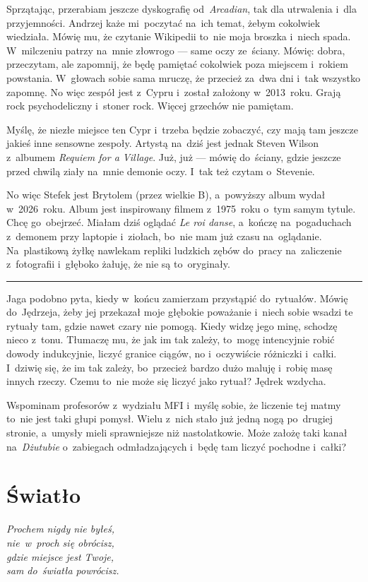 \documentclass[9pt, a5paper]{memoir}
\begin{document}
Sprzątając, przerabiam jeszcze dyskografię od~\textit{Arcadian}, tak dla utrwalenia i~dla przyjemności. Andrzej każe mi~poczytać na~ich temat, żebym cokolwiek wiedziała. Mówię mu, że czytanie Wikipedii to~nie moja broszka i~niech spada. W~milczeniu patrzy na~mnie złowrogo --- same oczy ze~ściany. Mówię: dobra, przeczytam, ale zapomnij, że będę pamiętać cokolwiek poza miejscem i~rokiem powstania. W~głowach sobie sama mruczę, że przecież za~dwa dni i~tak wszystko zapomnę. No więc zespół jest z~Cypru i~został założony w~2013~roku. Grają rock psychodeliczny i~stoner rock. Więcej grzechów nie pamiętam.

Myślę, że niezłe miejsce ten Cypr i~trzeba będzie zobaczyć, czy mają tam jeszcze jakieś inne sensowne zespoły. Artystą na~dziś jest jednak Steven Wilson z~albumem \textit{Requiem for a Village}. Już, już --- mówię do~ściany, gdzie jeszcze przed chwilą ziały na~mnie demonie oczy. I~tak też czytam o~Stevenie.

No więc Stefek jest Brytolem (przez wielkie B), a~powyższy album wydał w~2026~roku. Album jest inspirowany filmem z~1975~roku o~tym samym tytule. Chcę go~obejrzeć. Miałam dziś oglądać \textit{Le roi danse}, a~kończę na~pogaduchach z~demonem przy laptopie i~ziołach, bo~nie mam już czasu na~oglądanie. Na~plastikową żyłkę nawlekam repliki ludzkich zębów do~pracy na~zaliczenie z~fotografii i~głęboko żałuję, że nie są to~oryginały.

\fancybreak{* \quad * \quad *}

Jaga podobno pyta, kiedy w~końcu zamierzam przystąpić do~rytuałów. Mówię do~Jędrzeja, żeby jej przekazał moje głębokie poważanie i~niech sobie wsadzi te rytuały tam, gdzie nawet czary nie pomogą. Kiedy widzę jego minę, schodzę nieco z~tonu. Tłumaczę mu, że jak im tak zależy, to~mogę intencyjnie robić dowody indukcyjnie, liczyć granice ciągów, no i~oczywiście różniczki i~całki. I~dziwię się, że im tak zależy, bo~przecież bardzo dużo maluję i~robię masę innych rzeczy. Czemu to~nie może się liczyć jako rytuał? Jędrek wzdycha.

Wspominam profesorów z~wydziału MFI i~myślę sobie, że liczenie tej matmy to~nie jest taki głupi pomysł. Wielu z~nich stało już jedną nogą po~drugiej stronie, a~umysły mieli sprawniejsze niż nastolatkowie. Może założę taki kanał na~\textit{Dżutubie} o~zabiegach odmładzających i~będę tam liczyć pochodne i~całki?

\newpage
\section{Światło}
{
\itshape
Prochem nigdy nie byłeś,\\
nie~w~proch się obrócisz,\\
gdzie miejsce jest Twoje,\\
sam do~światła powrócisz.
}
\end{document}
